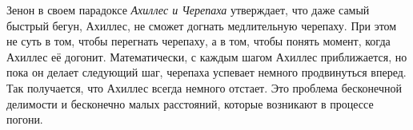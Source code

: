 

Зенон в своем парадоксе \textit{Ахиллес и Черепаха} утверждает, что даже самый быстрый бегун, Ахиллес, не сможет догнать медлительную черепаху. При этом не суть в том, чтобы перегнать черепаху, а в том, чтобы понять момент, когда Ахиллес её догонит. Математически, с каждым шагом Ахиллес приближается, но пока он делает следующий шаг, черепаха успевает немного продвинуться вперед. Так получается, что Ахиллес всегда немного отстает. Это проблема бесконечной делимости и бесконечно малых расстояний, которые возникают в процессе погони.


